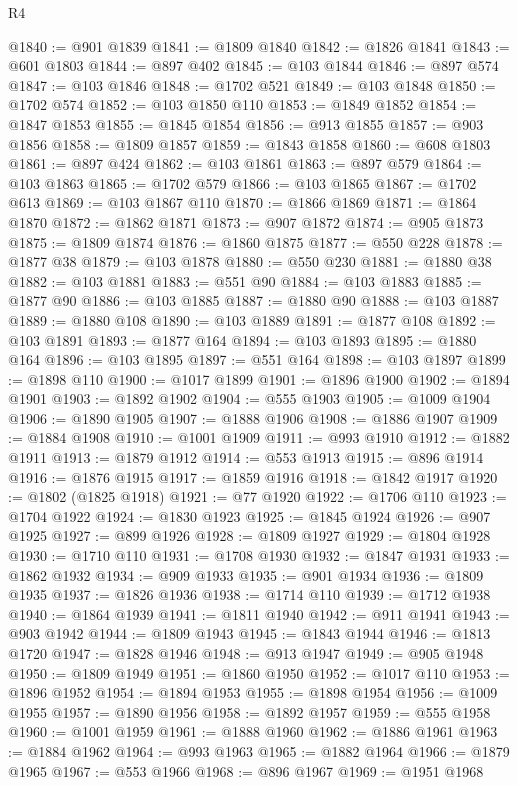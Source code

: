 \begin{lexlean}{R4}
\begin{coremodule}
@1840 := @901 @1839
@1841 := @1809 @1840
@1842 := @1826 @1841
@1843 := @601 @1803
@1844 := @897 @402
@1845 := @103 @1844
@1846 := @897 @574
@1847 := @103 @1846
@1848 := @1702 @521
@1849 := @103 @1848
@1850 := @1702 @574
@1852 := @103 @1850 @110
@1853 := @1849 @1852
@1854 := @1847 @1853
@1855 := @1845 @1854
@1856 := @913 @1855
@1857 := @903 @1856
@1858 := @1809 @1857
@1859 := @1843 @1858
@1860 := @608 @1803
@1861 := @897 @424
@1862 := @103 @1861
@1863 := @897 @579
@1864 := @103 @1863
@1865 := @1702 @579
@1866 := @103 @1865
@1867 := @1702 @613
@1869 := @103 @1867 @110
@1870 := @1866 @1869
@1871 := @1864 @1870
@1872 := @1862 @1871
@1873 := @907 @1872
@1874 := @905 @1873
@1875 := @1809 @1874
@1876 := @1860 @1875
@1877 := @550 @228
@1878 := @1877 @38
@1879 := @103 @1878
@1880 := @550 @230
@1881 := @1880 @38
@1882 := @103 @1881
@1883 := @551 @90
@1884 := @103 @1883
@1885 := @1877 @90
@1886 := @103 @1885
@1887 := @1880 @90
@1888 := @103 @1887
@1889 := @1880 @108
@1890 := @103 @1889
@1891 := @1877 @108
@1892 := @103 @1891
@1893 := @1877 @164
@1894 := @103 @1893
@1895 := @1880 @164
@1896 := @103 @1895
@1897 := @551 @164
@1898 := @103 @1897
@1899 := @1898 @110
@1900 := @1017 @1899
@1901 := @1896 @1900
@1902 := @1894 @1901
@1903 := @1892 @1902
@1904 := @555 @1903
@1905 := @1009 @1904
@1906 := @1890 @1905
@1907 := @1888 @1906
@1908 := @1886 @1907
@1909 := @1884 @1908
@1910 := @1001 @1909
@1911 := @993 @1910
@1912 := @1882 @1911
@1913 := @1879 @1912
@1914 := @553 @1913
@1915 := @896 @1914
@1916 := @1876 @1915
@1917 := @1859 @1916
@1918 := @1842 @1917
@1920 := @1802 (@1825 @1918)
@1921 := @77 @1920
@1922 := @1706 @110
@1923 := @1704 @1922
@1924 := @1830 @1923
@1925 := @1845 @1924
@1926 := @907 @1925
@1927 := @899 @1926
@1928 := @1809 @1927
@1929 := @1804 @1928
@1930 := @1710 @110
@1931 := @1708 @1930
@1932 := @1847 @1931
@1933 := @1862 @1932
@1934 := @909 @1933
@1935 := @901 @1934
@1936 := @1809 @1935
@1937 := @1826 @1936
@1938 := @1714 @110
@1939 := @1712 @1938
@1940 := @1864 @1939
@1941 := @1811 @1940
@1942 := @911 @1941
@1943 := @903 @1942
@1944 := @1809 @1943
@1945 := @1843 @1944
@1946 := @1813 @1720
@1947 := @1828 @1946
@1948 := @913 @1947
@1949 := @905 @1948
@1950 := @1809 @1949
@1951 := @1860 @1950
@1952 := @1017 @110
@1953 := @1896 @1952
@1954 := @1894 @1953
@1955 := @1898 @1954
@1956 := @1009 @1955
@1957 := @1890 @1956
@1958 := @1892 @1957
@1959 := @555 @1958
@1960 := @1001 @1959
@1961 := @1888 @1960
@1962 := @1886 @1961
@1963 := @1884 @1962
@1964 := @993 @1963
@1965 := @1882 @1964
@1966 := @1879 @1965
@1967 := @553 @1966
@1968 := @896 @1967
@1969 := @1951 @1968

\end{coremodule}
\end{lexlean}
